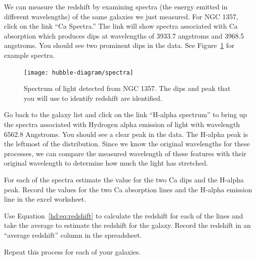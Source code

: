 We can measure the redshift by examining spectra (the energy emitted
in different wavelengths) of the same galaxies we just measured. For
NGC 1357, click on the link “Ca Spectra.” The link will show spectra
associated with Ca absorption which produces dips at wavelengths of
3933.7 angstroms and 3968.5 angstroms. You should see two
prominent dips in the data. See Figure~\ref{hd:fig:spectra} for example spectra.

\begin{figure}
	\centering
	\texttt{[image: hubble-diagram/spectra]}
	\caption{Spectrum of light detected from NGC 1357. The dips and peak that you will use to identify redshift are identified.}\label{hd:fig:spectra}
\end{figure}

Go back to the galaxy list and click on the
link “H-alpha spectrum” to bring up the spectra associated with
Hydrogen alpha emission of light with wavelength 6562.8 Angstroms.
You should see a clear peak in the data. The H-alpha peak is the leftmost
of the distribution. Since we know the original wavelengths for these
processes, we can compare the measured wavelength of these features
with their original wavelength to determine how much the light has
stretched.

\begin{steps}
	\item For each of the spectra estimate the value for the two Ca dips and the H-alpha peak. Record the values for the two Ca absorption lines and the H-alpha emission line in the excel worksheet. 
	
	\item Use Equation~\ref{hd:eq:redshift} to calculate the redshift for each of the lines and take the average to
estimate the redshift for the galaxy. Record the redshift in an “average
redshift” column in the spreadsheet.

	\item Repeat this process for each of
your galaxies.
\end{steps}

%
%
%	
%	


